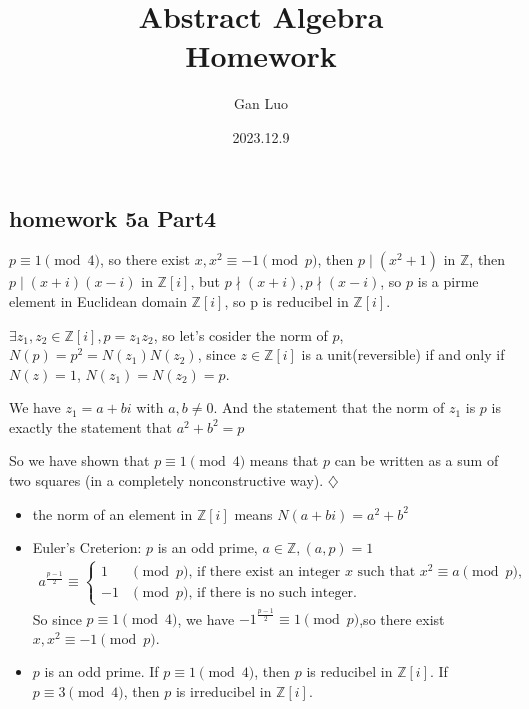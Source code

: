 \documentclass{report}
\title{\Huge{Abstract Algebra}\\Homework}
\author{\huge{Gan Luo}}
\date{2023.12.9}
\begin{document}
\maketitle
\newpage%
\tableofcontents
\pagebreak

\chapter{}
\section{homework 5a Part4}


\sol
{

$p\equiv 1 \pmod 4$, so there exist $x, x^2 \equiv -1 \pmod p$, then $p \mid (x^2+1)$ in $\mathbb{Z}$, then $p \mid (x+i)(x-i)$ in $\mathbb{Z}[i]$, but $p \nmid (x+i), p \nmid (x-i)$, so $p$ is a pirme element in Euclidean domain $\mathbb{Z}[i]$, so p is reducibel in $\mathbb{Z}[i]$.

$\exists z_1,z_2 \in \mathbb{Z}[i], p=z_1z_2$, so let's cosider the norm of $p$, $N(p)=p^2=N(z_1)N(z_2)$, since $z\in \mathbb{Z}[i]$ is a unit(reversible) if and only if $N(z)=1$, $N(z_1)=N(z_2)=p$.

We have $z_1=a+bi$ with $a,b \neq 0$. And the statement that the norm of $z_1$ is $p$ is exactly the statement that $a^2+b^2=p$

So we have shown that $p \equiv 1 \pmod 4$ means that $p$ can be written as a sum of two squares (in a completely nonconstructive way). $\diamondsuit$

\begin{note}
    \begin{itemize}
        \item the norm of an element in $\mathbb{Z}[i]$ means $N(a+bi)=a^2+b^2$
        \item Euler's Creterion: $p$ is an odd prime, $a\in \mathbb{Z},(a,p)=1$\begin{align*}
                  a^{\frac{p-1}{2}} \equiv \begin{cases}1 &\pmod p \text{, if there exist an integer $x$ such that $x^2 \equiv a \pmod p$,}\\ -1 &\pmod p  \text{, if there is no such integer.} \end{cases}
              \end{align*}So since $p \equiv 1 \pmod 4$, we have $-1^{\frac{p-1}{2}}\equiv 1 \pmod p$,so there exist $x, x^2 \equiv -1 \pmod p$.
        \item $p$ is an odd prime. If $p \equiv 1 \pmod 4$, then $p$ is reducibel in $\mathbb{Z}[i]$. If $p \equiv 3 \pmod 4$, then $p$ is irreducibel in $\mathbb{Z}[i]$.
    \end{itemize}
\end{note}

}
\end{document}
